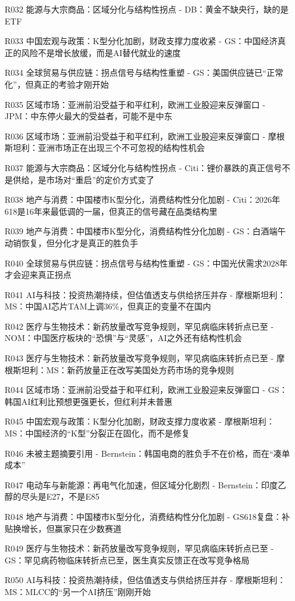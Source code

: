\documentclass[11pt]{ctexart}
\begin{document}
\begin{itemize}
  \item [R032] 能源与大宗商品：区域分化与结构性拐点 - DB：黄金不缺央行，缺的是ETF
  \item [R033] 中国宏观与政策：K型分化加剧，财政支撑力度收紧 - GS：中国经济真正的风险不是增长放缓，而是AI替代就业的速度
  \item [R034] 全球贸易与供应链：拐点信号与结构性重塑 - GS：美国供应链已“正常化”，但真正的考验才刚开始
  \item [R035] 区域市场：亚洲前沿受益于和平红利，欧洲工业股迎来反弹窗口 - JPM：中东停火最大的受益者，可能不是中东
  \item [R036] 区域市场：亚洲前沿受益于和平红利，欧洲工业股迎来反弹窗口 - 摩根斯坦利：亚洲市场正在出现三个不可忽视的结构性机会
  \item [R037] 能源与大宗商品：区域分化与结构性拐点 - Citi：锂价暴跌的真正信号不是供给，是市场对“重启”的定价方式变了
  \item [R038] 地产与消费：中国楼市K型分化，消费结构性分化加剧 - Citi：2026年618是16年来最低调的一届，但真正的信号藏在品类结构里
  \item [R039] 地产与消费：中国楼市K型分化，消费结构性分化加剧 - GS：白酒端午动销恢复，但分化才是真正的胜负手
  \item [R040] 全球贸易与供应链：拐点信号与结构性重塑 - GS：中国光伏需求2028年才会迎来真正拐点
  \item [R041] AI与科技：投资热潮持续，但估值透支与供给挤压并存 - 摩根斯坦利：MS：中国AI芯片TAM上调36\%，但真正的变量不在国内
  \item [R042] 医疗与生物技术：新药放量改写竞争规则，罕见病临床转折点已至 - NOM：中国医疗板块的“恐惧”与“灵感”，AI之外还有结构性机会
  \item [R043] 医疗与生物技术：新药放量改写竞争规则，罕见病临床转折点已至 - 摩根斯坦利：MS：新药放量正在改写美国处方药市场的竞争规则
  \item [R044] 区域市场：亚洲前沿受益于和平红利，欧洲工业股迎来反弹窗口 - GS：韩国AI红利比预想更强更长，但红利并未普惠
  \item [R045] 中国宏观与政策：K型分化加剧，财政支撑力度收紧 - 摩根斯坦利：MS：中国经济的“K型”分裂正在固化，而不是修复
  \item [R046] 未被主题摘要引用 - Bernstein：韩国电商的胜负手不在价格，而在“凑单成本”
  \item [R047] 电动车与新能源：再电气化加速，但区域分化剧烈 - Bernstein：印度乙醇的尽头是E27，不是E85
  \item [R048] 地产与消费：中国楼市K型分化，消费结构性分化加剧 - GS618复盘：补贴换增长，但赢家只在少数赛道
  \item [R049] 医疗与生物技术：新药放量改写竞争规则，罕见病临床转折点已至 - GS：罕见病药物临床转折点已至，医生真实反馈正在改写竞争格局
  \item [R050] AI与科技：投资热潮持续，但估值透支与供给挤压并存 - 摩根斯坦利：MS：MLCC的“另一个AI挤压”刚刚开始
\end{itemize}
\end{document}
